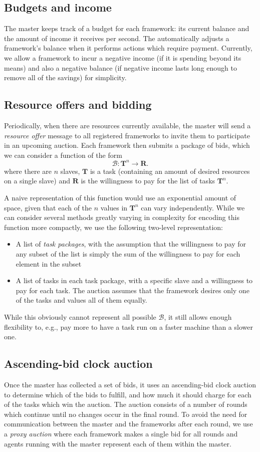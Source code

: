 \documentclass{acm_proc_article-sp}
\begin{document}
\subsection{Budgets and income}
The master keeps track of a budget for each framework: its current balance and
the amount of income it receives per second. The automatically adjusts a
framework's balance when it performs actions which require payment. Currently,
we allow a framework to incur a negative income (if it is spending beyond its
means) and also a negative balance (if negative income lasts long enough to
remove all of the savings) for simplicity.

\subsection{Resource offers and bidding}
Periodically, when there are resources currently available, the master will
send a \emph{resource offer} message to all registered frameworks to invite them
to participate in an upcoming auction. Each framework then submits a package of
bids, which we can consider a function of the form
\[ \mathcal{B}: \mathbf{T}^n \rightarrow \mathbf{R}. \]
where there are $n$ slaves, $\mathbf{T}$ is a task (containing an amount of desired
resources on a single slave) and $\mathbf{R}$ is the willingness to pay for the
list of tasks $\mathbf{T}^n$.

A naive representation of this function would use an exponential amount of
space, given that each of the $n$ values in $\mathbf{T}^n$ can vary
independently. While we can consider several methods greatly varying in
complexity for encoding this function more compactly, we use the following
two-level representation:
\begin{itemize}
  \item A list of \emph{task packages}, with the assumption that the willingness
    to pay for any subset of the list is simply the sum of the willingness to
    pay for each element in the subset
  \item A list of tasks in each task package, with a specific slave and a
    willingness to pay for each task. The auction assumes that the framework
    desires only one of the tasks and values all of them equally.
\end{itemize}
While this obviously cannot represent all possible $\mathcal{B}$, it still
allows enough flexibility to, e.g., pay more to have a task run on a faster
machine than a slower one.

\subsection{Ascending-bid clock auction}
Once the master has collected a set of bids, it uses an ascending-bid clock
auction to determine which of the bids to fulfill, and how much it should charge
for each of the tasks which win the auction. The auction consists of a number of
rounds which continue until no changes occur in the final round. To avoid the
need for communication between the master and the frameworks after each round,
we use a \emph{proxy auction} where each framework makes a single bid for all
rounds and agents running with the master represent each of them within the
master.
\end{document}
